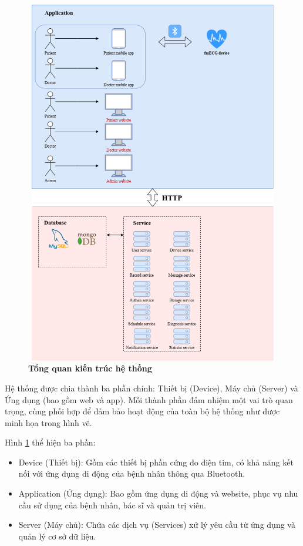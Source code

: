 \begin{figure}[H]
	\centering
	\includegraphics[width=12cm,height=16cm]{Images/System/fmECG_architecture-System_Architecture.drawio.png}
	\caption[Tổng quan kiến trúc hệ thống]{\bfseries \fontsize{12pt}{0pt}\selectfont Tổng quan kiến trúc hệ thống}
	\label{fmECG_architecture-System} %
\end{figure}
Hệ thống được chia thành ba phần chính: Thiết bị (Device), Máy chủ (Server) và Ứng dụng (bao gồm web và app).
Mỗi thành phần đảm nhiệm một vai trò quan trọng, cùng phối hợp để đảm bảo hoạt động của toàn bộ hệ thống như được minh họa trong hình vẽ.

Hình \ref{fmECG_architecture-System} thể hiện ba phần:

\begin{adjustwidth}{1.5em}{}
	\begin{itemize}
		\item Device (Thiết bị): Gồm các thiết bị phần cứng đo điện tim, có khả năng kết nối với ứng dụng di động của bệnh nhân thông qua Bluetooth.
		\item Application (Ứng dụng): Bao gồm ứng dụng di động và website, phục vụ nhu cầu sử dụng của bệnh nhân, bác sĩ và quản trị viên.
		\item Server (Máy chủ): Chứa các dịch vụ (Services) xử lý yêu cầu từ ứng dụng và quản lý cơ sở dữ liệu.
	\end{itemize}
\end{adjustwidth}

